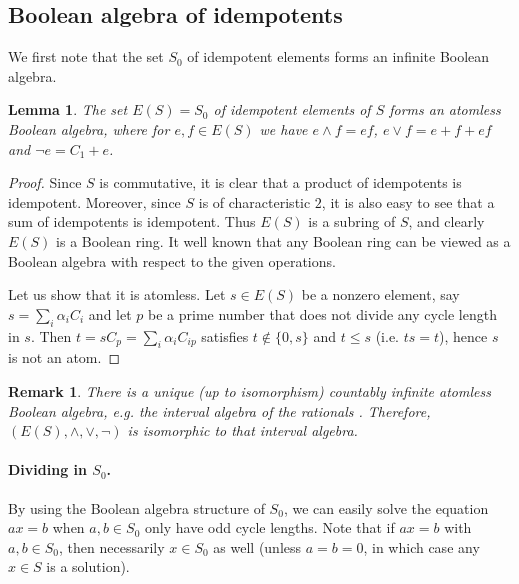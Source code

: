 \documentclass[a4paper, 11pt]{article}
\theoremstyle{plain}
\newtheorem{lemma}      [theorem]{Lemma}
\newtheorem{remark}     [theorem]{Remark}
\theoremstyle{definition}
\newcommand{\join}      {\lor}
\newcommand{\meet}      {\land}
\begin{document}
\subsection{Boolean algebra of idempotents} \label{subsection:boolean_algebra_S0}

We first note that the set $S_0$ of idempotent elements forms an infinite Boolean algebra.

\begin{lemma}
\label{lem:lattice}
The set $E(S) = S_0$ of idempotent elements of $S$ forms an atomless Boolean algebra, where for $e, f \in E(S)$  we have $e \meet f = ef$, $e \join f = e + f + ef$ and $\neg e = C_1+e$.
\end{lemma}

\begin{proof}
Since $S$ is commutative, it is clear that a product of idempotents is idempotent. Moreover, since $S$ is of characteristic $2$, it is also easy to see that a sum of idempotents is idempotent. Thus $E(S)$ is a subring of $S$, and clearly $E(S)$ is a Boolean ring. It well known \cite[Chapter 2]{GH09} that any Boolean ring can be viewed as a Boolean algebra with respect to the given operations.  

Let us show that it is atomless. Let $s \in E(S)$ be a nonzero element, say $s = \sum_i \alpha_i C_i$ and let $p$ be a prime number that does not divide any cycle length in $s$. Then $t = sC_p = \sum_i \alpha_i C_{ip}$ satisfies $t \notin \{ 0, s \}$ and $t \le s$ (i.e. $ts = t$), hence $s$ is not an atom.
\end{proof}

\begin{remark}
\label{rem:atomlessB}
There is a unique (up to isomorphism) countably infinite atomless Boolean algebra, e.g. the interval algebra of the rationals \cite[Chapter 16]{GH09}. Therefore, $(E(S), \meet, \join, \neg)$ is isomorphic to that interval algebra.
\end{remark}



\paragraph{Dividing in $S_0$.}

By using the Boolean algebra structure of $S_0$, we can easily solve the equation $ax = b$ when $a, b \in S_0$ only have odd cycle lengths. Note that if $ax = b$ with $a,b \in S_0$, then necessarily $x \in S_0$ as well (unless $a = b = 0$, in which case any $x \in S$ is a solution).
\end{document}
